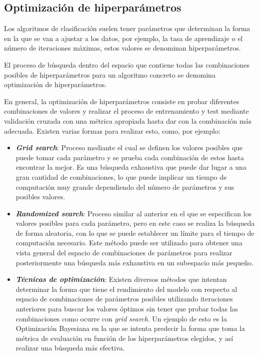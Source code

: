 \subsection{Optimización de hiperparámetros}

Los algoritmos de clasificación suelen tener parámetros que determinan la forma
en la que se van a ajustar a los datos, por ejemplo, la tasa de aprendizaje o el
número de iteraciones máximas, estos valores se denominan hiperparámetros.

El proceso de búsqueda dentro del espacio que contiene todas las combinaciones
posibles de hiperparámetros para un algoritmo concreto se denomina optimización
de hiperparámetros.

En general, la optimización de hiperparámetros consiste en probar diferentes
combinaciones de valores y realizar el proceso de entrenamiento y test mediante
validación cruzada con una métrica apropiada hasta dar con la combinación más
adecuada. Existen varias formas para realizar esto, como, por ejemplo:

\begin{itemize}
    \item \textbf{\textit{Grid search}}: Proceso mediante el cual se definen los
    valores posibles que puede tomar cada parámetro y se prueba cada combinación
    de estos hasta encontrar la mejor. Es una búsqueda exhaustiva que puede dar
    lugar a una gran cantidad de combinaciones, lo que puede implicar un tiempo
    de computación muy grande dependiendo del número de parámetros y sus
    posibles valores.
    \item \textbf{\textit{Randomized search}}: Proceso similar al anterior en el
    que se especifican los valores posibles para cada parámetro, pero en este
    caso se realiza la búsqueda de forma aleatoria, con lo que se puede
    establecer un límite para el tiempo de computación necesario. Este método
    puede ser utilizado para obtener una vista general del espacio de
    combinaciones de parámetros para realizar posteriormente una búsqueda más
    exhaustiva en un subespacio más pequeño.
    \item \textbf{\textit{Técnicas de optimización}}: Existen diversos métodos
    que intentan determinar la forma que tiene el rendimiento del modelo con
    respecto al espacio de combinaciones de parámetros posibles utilizando
    iteraciones anteriores para buscar los valores óptimos sin tener que probar
    todas las combinaciones como ocurre con \textit{grid search}. Un ejemplo de
    esto es la Optimización Bayesiana \cite{wu2019hyperparameter} en la que se
    intenta predecir la forma que toma la métrica de evaluación en función de
    los hiperparámetros elegidos, y así realizar una búsqueda más efectiva.
\end{itemize}
